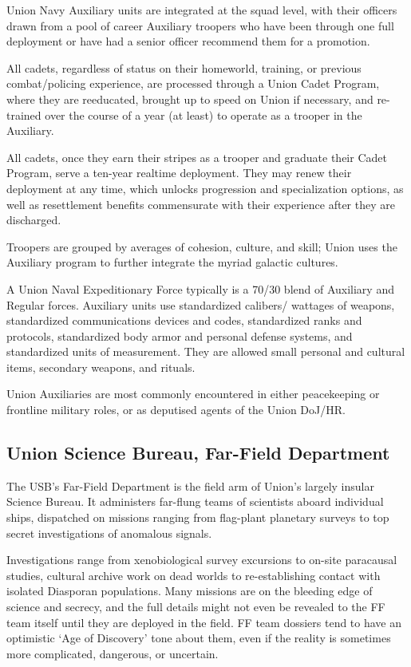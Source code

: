 Union Navy Auxiliary units are integrated at the squad level, with their officers drawn from a pool
of career Auxiliary troopers who have been through one full deployment or have had a senior
officer recommend them for a promotion.

All cadets, regardless of status on their homeworld, training, or previous combat/policing
experience, are processed through a Union Cadet Program, where they are reeducated, brought
up to speed on Union if necessary, and re-trained over the course of a year (at least) to operate
as a trooper in the Auxiliary.

All cadets, once they earn their stripes as a trooper and graduate their Cadet Program, serve a
ten-year realtime deployment. They may renew their deployment at any time, which unlocks
progression and specialization options, as well as resettlement benefits commensurate with their
experience after they are discharged.

Troopers are grouped by averages of cohesion, culture, and skill; Union uses the Auxiliary
program to further integrate the myriad galactic cultures.

A Union Naval Expeditionary Force typically is a 70/30 blend of Auxiliary and Regular forces.
Auxiliary units use standardized calibers/ wattages of weapons, standardized communications
devices and codes, standardized ranks and protocols, standardized body armor and personal
defense systems, and standardized units of measurement. They are allowed small personal and
cultural items, secondary weapons, and rituals.

Union Auxiliaries are most commonly encountered in either peacekeeping or frontline military
roles, or as deputised agents of the Union DoJ/HR.

\subsection{Union Science Bureau, Far-Field Department}

The USB’s Far-Field Department is the field arm of Union’s largely insular Science Bureau. It
administers far-flung teams of scientists aboard individual ships, dispatched on missions ranging
from flag-plant planetary surveys to top secret investigations of anomalous signals.

Investigations range from xenobiological survey excursions to on-site paracausal studies,
cultural archive work on dead worlds to re-establishing contact with isolated Diasporan
populations. Many missions are on the bleeding edge of science and secrecy, and the full details
might not even be revealed to the FF team itself until they are deployed in the field. FF team
dossiers tend to have an optimistic ‘Age of Discovery’ tone about them, even if the reality is
sometimes more complicated, dangerous, or uncertain.

